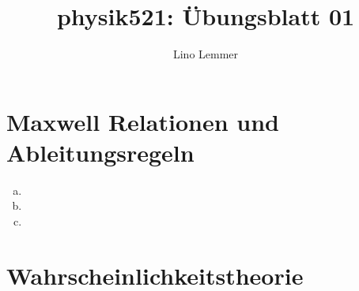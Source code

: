 

\setcounter{section}{1}
\renewcommand\thesection{H\,1.\arabic{section}}

\title{physik521: Übungsblatt 01}
\author{Lino Lemmer}


\maketitle
\section{Maxwell Relationen und Ableitungsregeln}

\begin{enumerate}[(a)]
    \item
    \item
    \item
\end{enumerate}

\section{Wahrscheinlichkeitstheorie}

